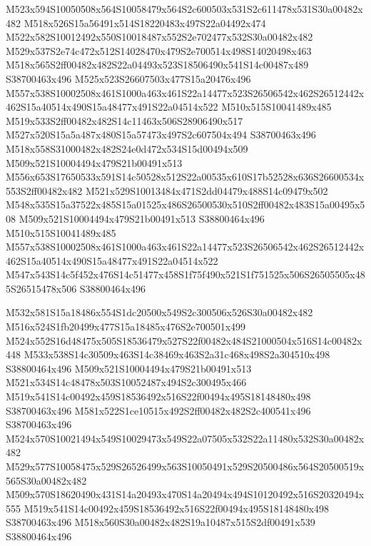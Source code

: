 \documentclass{article}
\begin{document}
\begin{multicols}{2}
M523x594S10050508x564S10058479x564S2c600503x531S2c611478x531S30a00482x482 M518x526S15a56491x514S18220483x497S22a04492x474 M522x582S10012492x550S10018487x552S2e702477x532S30a00482x482 M529x537S2e74c472x512S14028470x479S2e700514x498S14020498x463 M518x565S2ff00482x482S22a04493x523S18506490x541S14c00487x489 S38700463x496 M525x523S26607503x477S15a20476x496 M557x538S10002508x461S1000a463x461S22a14477x523S26506542x462S26512442x462S15a40514x490S15a48477x491S22a04514x522 M510x515S10041489x485 M519x533S2ff00482x482S14c11463x506S28906490x517 M527x520S15a5a487x480S15a57473x497S2c607504x494 S38700463x496 M518x558S31000482x482S24e0d472x534S15d00494x509 M509x521S10004494x479S21b00491x513 M556x653S17650533x591S14c50528x512S22a00535x610S17b52528x636S26600534x553S2ff00482x482 M521x529S10013484x471S2dd04479x488S14c09479x502 M548x535S15a37522x485S15a01525x486S26500530x510S2ff00482x483S15a00495x508 M509x521S10004494x479S21b00491x513 S38800464x496 M510x515S10041489x485 M557x538S10002508x461S1000a463x461S22a14477x523S26506542x462S26512442x462S15a40514x490S15a48477x491S22a04514x522 M547x543S14c5f452x476S14c51477x458S1f75f490x521S1f751525x506S26505505x485S26515478x506 S38800464x496

M532x581S15a18486x554S1dc20500x549S2c300506x526S30a00482x482 M516x524S1fb20499x477S15a18485x476S2e700501x499 M524x552S16d48475x505S18536479x527S22f00482x484S21000504x516S14c00482x448 M533x538S14c30509x463S14c38469x463S2a31c468x498S2a304510x498 S38800464x496 M509x521S10004494x479S21b00491x513 M521x534S14c48478x503S10052487x494S2c300495x466 M519x541S14c00492x459S18536492x516S22f00494x495S18148480x498 S38700463x496 M581x522S1ce10515x492S2ff00482x482S2c400541x496 S38700463x496 M524x570S10021494x549S10029473x549S22a07505x532S22a11480x532S30a00482x482 M529x577S10058475x529S26526499x563S10050491x529S20500486x564S20500519x565S30a00482x482 M509x570S18620490x431S14a20493x470S14a20494x494S10120492x516S20320494x555 M519x541S14c00492x459S18536492x516S22f00494x495S18148480x498 S38700463x496 M518x560S30a00482x482S19a10487x515S2df00491x539 S38800464x496


\end{multicols}
\end{document}
